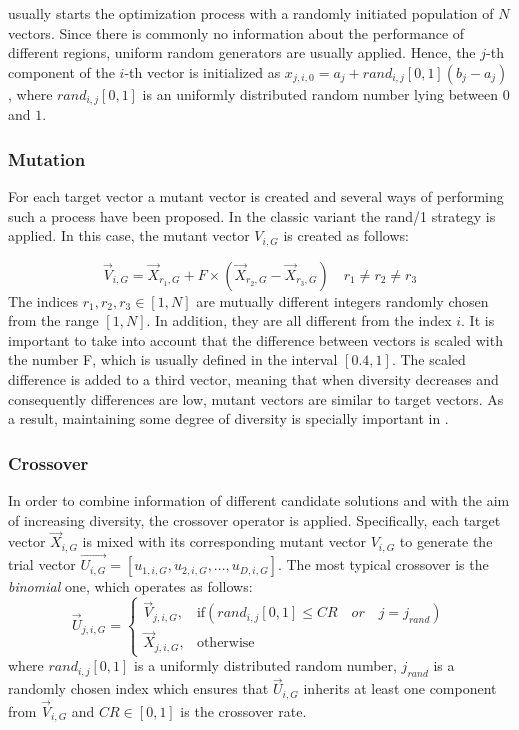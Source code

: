 \DE{} usually starts the optimization process with a randomly initiated population of $N$ vectors.
%
Since there is commonly no information about the performance of different regions, uniform random generators are usually applied.
%
Hence, the $j$-th component of the $i$-th vector is initialized as $x_{j,i,0} = a_{j} + rand_{i,j}[0,1] (b_{j} - a_{j})$,
where $rand_{i,j}[0,1]$ is an uniformly distributed random number lying between $0$ and $1$.

\subsubsection{Mutation}

For each target vector a mutant vector is created and several ways of performing
such a process have been proposed.
%
In the classic \DE{} variant the rand/1 strategy is applied.
%
In this case, the mutant vector $V_{i,G}$ is created as follows:

\begin{equation}\label{eqn:mutation}
\vec{V}_{i,G} = \vec{X}_{r_1, G} + F \times (\vec{X}_{r_2, G} - \vec{X}_{r_3, G}) \quad r_1 \neq r_2 \neq r_3
\end{equation}
%
The indices $r_1, r_2, r_3 \in [1,N]$ are mutually different integers randomly chosen from the range $[1, N]$.
%
In addition, they are all different from the index $i$.
%
It is important to take into account that the difference between vectors is scaled with the number F, which is usually defined in the interval $[0.4, 1]$.
%
The scaled difference is added to a third vector, meaning that
when diversity decreases and consequently differences are low, mutant vectors are similar to target vectors.
%
As a result, maintaining some degree of diversity is specially important in \DE{}.

\subsubsection{Crossover}

In order to combine information of different candidate solutions and with the aim of increasing diversity, the crossover
operator is applied.
%
Specifically, each target vector $\vec{X}_{i,G}$ is mixed with its corresponding mutant vector $V_{i,G}$ to 
generate the trial vector $\vec{U_{i,G}} = [u_{1,i,G},u_{2,i,G}, ..., u_{D,i,G} ]$.
%
The most typical crossover is the \textit{binomial} one, which operates as follows:
%
\begin{equation} \label{eqn:crossover}
\vec{U}_{j,i,G}= 
\begin{cases}
    \vec{V}_{j,i,G},& \text{if} (rand_{i,j}[0,1] \leq CR \quad or \quad j = j_{rand}  )\\
    \vec{X}_{j,i,G},              & \text{otherwise}
\end{cases}
\end{equation}
where $rand_{i,j}[0,1]$ is a uniformly distributed random number,
$j_{rand}$ is a randomly chosen index which ensures that $\vec{U}_{i,G}$ inherits at least one component from $\vec{V}_{i,G}$ and
$CR \in [0,1]$ is the crossover rate.


